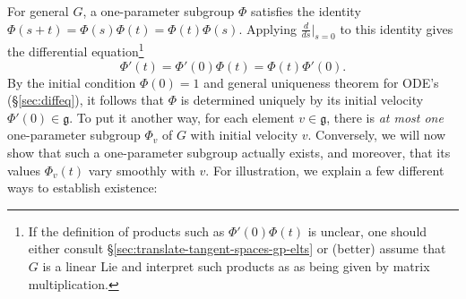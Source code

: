 \documentclass[reqno]{amsart} 
\begin{document}
For general $G$, a one-parameter subgroup $\Phi$ satisfies the
identity $\Phi(s+t) = \Phi(s) \Phi(t) = \Phi(t) \Phi(s)$.
Applying $\frac{d}{ d s}|_{s=0}$ to this identity gives the
differential equation\footnote{
  If the definition
  of products such as
  $\Phi'(0) \Phi(t)$ is unclear,
  one should either consult
  \S\ref{sec:translate-tangent-spaces-gp-elts}
  or (better)
  assume
  that $G$ is a linear Lie and interpret such products as
  as being given by matrix multiplication.
}
\begin{equation}\label{eq:one-param-subgp-diffeq}
  \Phi '(t)= \Phi '(0) \Phi(t) = \Phi(t) \Phi'(0).
\end{equation}
By the initial condition $\Phi(0) = 1$
and general uniqueness theorem for ODE's (\S\ref{sec:diffeq}),
it follows that $\Phi$ is determined uniquely
by its initial velocity $\Phi'(0) \in \mathfrak{g}$.
To put it another way, for each element $v \in \mathfrak{g}$,
there is \emph{at most one} one-parameter
subgroup $\Phi_v$ of $G$ with initial velocity $v$.
Conversely,
we will now show that such a one-parameter subgroup actually
exists, and moreover, that its values $\Phi_v(t)$ vary smoothly
with $v$.
For illustration, we explain a few different ways to establish existence:
\end{document}
